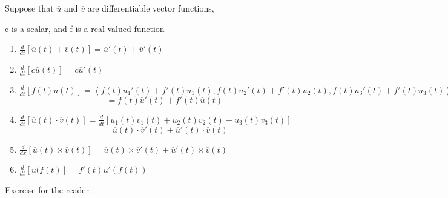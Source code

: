 \begin{theorem}[]
	Suppose that $\overline{u}$ and $\overline{v}$ are differentiable vector functions,

	c is a scalar, and f is a real valued function
	\begin{enumerate}
		\item $\frac{d}{dt}[\overline{u}(t) + \overline{v}(t)] = \overline{u}'(t) + \overline{v}'(t)$
		\item $\frac{d}{dt}[c \overline{u}(t)] = c \overline{u}'(t) $
		\item $\frac{d}{dt}[f(t) \overline{u}(t)] = \left< f(t)u_1'(t) + f'(t)u_1(t), f(t)u_2'(t) + f'(t)u_2(t),f(t)u_3'(t) + f'(t)u_3(t)\right>$
			\[= f(t) \overline{u}'(t) + f'(t)\overline{u}(t)\]
		\item $\frac{d}{dt}\left[ \overline{u}(t) \cdot \overline{v}(t) \right] = \frac{d}{dt}\left[ u_1(t)v_1(t) + u_2(t)v_2(t)+u_3(t)v_3(t) \right] $
			\[= \overline{u}(t) \cdot \overline{v}'(t) + \overline{u}'(t) \cdot \overline{v}(t)\]
		\item $\frac{d}{dx} \left[ \overline{u}(t) \times  \overline{v}(t) \right] = \overline{u}(t) \times \overline{v}'(t) + \overline{u}'(t)\times \overline{v}(t)$
		\item $\frac{d}{dt}\left[ \overline{u}(f(t) \right] = f'(t) \overline{u}'(f(t))$

	\end{enumerate}
\end{theorem}
\begin{example}
Exercise for the reader.
\end{example}









\newpage


